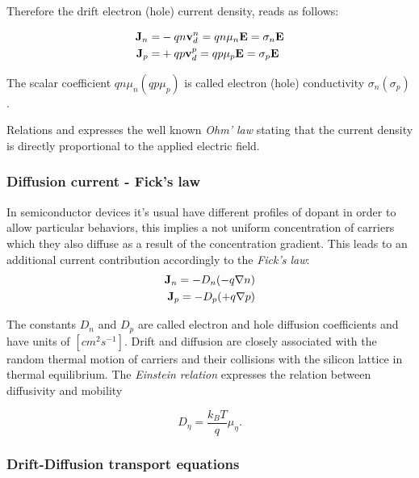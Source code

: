 Therefore the drift electron (hole) current density, reads as follows:

\begin{align}
\mathbf{J}_n =& -qn\mathbf{v}_d^n = qn\mu_n\mathbf{E}   = \sigma_n\mathbf{E} \label{eq: drift electron} \\ 
\mathbf{J}_p =& +qp\mathbf{v}_d^p = qp\mu_p\mathbf{E} = \sigma_p\mathbf{E} \label{eq: drift hole}
\end{align}

The scalar coefficient $qn\mu_n(qp\mu_p)$ is called electron (hole) conductivity $\sigma_n(\sigma_p)$. 

Relations  and  expresses the well known \textit{Ohm' law} stating that the current density is directly proportional to the applied electric field.


\subsubsection{Diffusion current - Fick's law}

In semiconductor devices it's usual have different profiles of dopant in order to allow particular behaviors, this implies a not uniform concentration of carriers which they also diffuse as a result of the concentration gradient. This leads to an additional current contribution accordingly to the \textit{Fick's law}:
\begin{align}
\mathbf{J}_n = -D_n(-q\nabla n) \label{eq: diff electron}\\
\mathbf{J}_p = -D_p(+q\nabla p) \label{eq: diff hole}
\end{align}

The constants $D_n$ and $D_p$ are called electron and hole diffusion coefficients and have units of $[cm^2s^{-1}]$. Drift and diffusion are closely associated with the random thermal motion of carriers and their collisions with the silicon lattice in thermal equilibrium. The \textit{Einstein relation}  expresses the relation between diffusivity and mobility

\begin{equation}
\label{eq: einstein relation}
D_\eta = \dfrac{k_BT}{q}\mu_\eta.
\end{equation}

\subsubsection{Drift-Diffusion transport equations}
\label{subsub:driftdiffusion transport}

